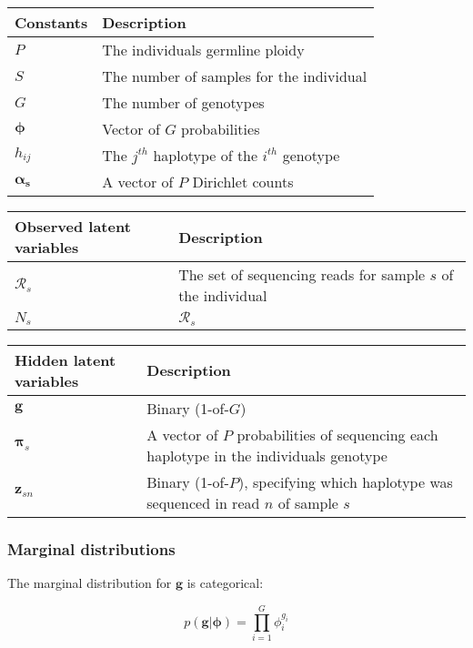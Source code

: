 \documentclass{article}
\begin{document}
\begin{center}
\begin{tabular}{ll}
Constants & Description \\
\hline
$P$ & The individuals germline ploidy \\
$S$ & The number of samples for the individual \\
$G$ & The number of genotypes \\
$\boldsymbol{\phi}$ & Vector of $G$ probabilities \\
$h_{ij}$ & The $j^{th}$ haplotype of the $i^{th}$ genotype \\
$\boldsymbol{\alpha_s}$ & A vector of $P$ Dirichlet counts \\
\hline
\end{tabular}
\end{center}

\begin{center}
\begin{tabular}{ll}
Observed latent variables & Description \\
\hline
$\mathcal{R}_s$ & The set of sequencing reads for sample $s$ of the individual \\
$N_s$ & $\mathcal{R}_s$ \\
\hline
\end{tabular}
\end{center}

\begin{center}
\begin{tabular}{ll}
Hidden latent variables & Description \\
\hline
$\boldsymbol{g}$ & Binary (1-of-$G$) \\
$\boldsymbol{\pi}_s$ & A vector of $P$ probabilities of sequencing each haplotype in the individuals genotype \\
$\boldsymbol{z}_{sn}$ & Binary (1-of-$P$), specifying which haplotype was sequenced in read $n$ of sample $s$ \\
\hline
\end{tabular}
\end{center}

\subsubsection{Marginal distributions}

The marginal distribution for $\boldsymbol{g}$ is categorical:

\begin{equation}
\label{eq:cnv_g_marginal}
    p(\boldsymbol{g} | \boldsymbol{\phi}) = \prod_{i = 1}^G \phi_i^{g_i}
\end{equation}
\end{document}

